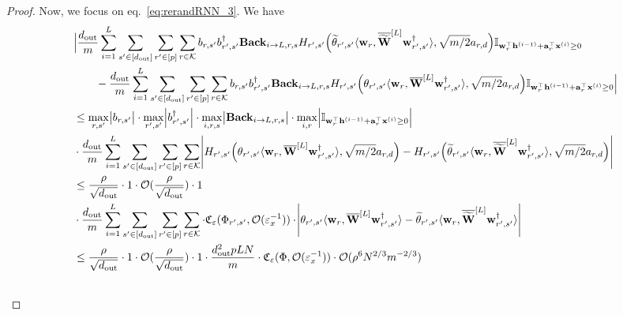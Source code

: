 \begin{proof}
			Now, we focus on eq.~\ref{eq:rerandRNN_3}. We have
			\begingroup \allowdisplaybreaks
			\begin{align}
				&\Big| \frac{\dout }{m} \sum_{i=1}^{L}  \sum_{s' \in [\dout ]} \sum_{r' \in [p]} \sum_{r \in \mathcal{K}}  b_{r, s'} b_{r', s'}^{\dagger} \mathbf{Back}_{i \to L, r, s}  H_{r', s'}\Big(\widetilde{\theta}_{r', s'} \langle \mathbf{w}_{r}, \overline{\widetilde{\mathbf{W}}}^{[L]} \mathbf{w}_{r', s'}^{\dagger}\rangle , \sqrt{m/2} a_{r, d}\Big) \mathbb{I}_{\mathbf{w}_r^{\top} \mathbf{h}^{(i-1)} + \mathbf{a}_r^{\top} \mathbf{x}^{(i)} \ge 0} \nonumber\\&
				\quad \quad -  \frac{\dout }{m} \sum_{i=1}^{L}  \sum_{s' \in [\dout ]} \sum_{r' \in [p]} \sum_{r \in \mathcal{K}}  b_{r, s'} b_{r', s'}^{\dagger} \mathbf{Back}_{i \to L, r, s}  H_{r', s'}\Big(\theta_{r', s'} \langle \mathbf{w}_{r}, \overline{\mathbf{W}}^{[L]} \mathbf{w}_{r', s'}^{\dagger}\rangle , \sqrt{m/2} a_{r, d}\Big) \mathbb{I}_{\mathbf{w}_r^{\top} \mathbf{h}^{(i-1)} + \mathbf{a}_r^{\top} \mathbf{x}^{(i)} \ge 0} \Big| \nonumber\\&
				\le \max_{r,s'} \abs{b_{r, s'}} \cdot \max_{r',s'} \abs{b_{r', s'}^{\dagger}} \cdot \max_{i, r, s} \abs{\mathbf{Back}_{i \to L, r, s}} \cdot \max_{i, r} \abs{\mathbb{I}_{\mathbf{w}_r^{\top} \mathbf{h}^{(i-1)} + \mathbf{a}_r^{\top} \mathbf{x}^{(i)} \ge 0}} \nonumber\\&
				\cdot \frac{\dout }{m} \sum_{i=1}^{L}  \sum_{s' \in [\dout ]} \sum_{r' \in [p]} \sum_{r \in \mathcal{K}} \abs{H_{r', s'}\Big(\theta_{r', s'} \langle \mathbf{w}_{r}, \overline{\mathbf{W}}^{[L]} \mathbf{w}_{r', s'}^{\dagger}\rangle , \sqrt{m/2} a_{r, d}\Big) - H_{r', s'}\Big(\widetilde{\theta}_{r', s'} \langle \mathbf{w}_{r}, \overline{\widetilde{\mathbf{W}}}^{[L]} \mathbf{w}_{r', s'}^{\dagger}\rangle , \sqrt{m/2} a_{r, d}\Big)} \nonumber\\&
				\le \frac{\rho}{\sqrt{\dout }} \cdot 1 \cdot \mathcal{O}(\frac{\rho}{\sqrt{\dout }}) \cdot 1 \\& \cdot \frac{\dout }{m} \sum_{i=1}^{L}  \sum_{s' \in [\dout ]} \sum_{r' \in [p]} \sum_{r \in \mathcal{K}} \cdot \mathfrak{C}_{\varepsilon}(\Phi_{r',s'}, \mathcal{O}(\varepsilon_x^{-1}))  \cdot \abs{\theta_{r', s'} \langle \mathbf{w}_{r}, \overline{\mathbf{W}}^{[L]} \mathbf{w}_{r', s'}^{\dagger}\rangle -  \widetilde{\theta}_{r', s'} \langle \mathbf{w}_{r}, \overline{\widetilde{\mathbf{W}}}^{[L]} \mathbf{w}_{r', s'}^{\dagger}\rangle} \label{eq:rerandRNN_3_preprefinal}\\&
				\le \frac{\rho}{\sqrt{\dout }} \cdot 1 \cdot \mathcal{O}(\frac{\rho}{\sqrt{\dout }}) \cdot 1 \cdot \frac{\dout ^2pL N}{m} \cdot \mathfrak{C}_{\varepsilon}(\Phi, \mathcal{O}(\varepsilon_x^{-1})) \cdot \mathcal{O}(\rho^6 N^{2/3} m^{-2/3} ) \label{eq:rerandRNN_3_prefinal} \\& 

\end{align}
\end{proof}
